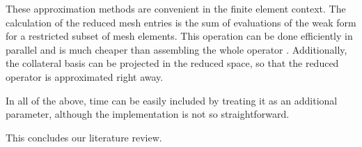 These approximation methods are convenient in the finite element context.
The calculation of the reduced mesh entries is the sum of evaluations of the 
weak form for a restricted subset of mesh elements.
This operation can be done efficiently in parallel and 
is much cheaper than assembling the whole operator 
\cite{Santo_Manzoni_2019}.
Additionally, the collateral basis can be projected in the reduced space,
so that the reduced operator is approximated right away. 

In all of the above, 
time can be easily included by treating it as an additional parameter,
although the implementation is not so straightforward. 

This concludes our literature review.





